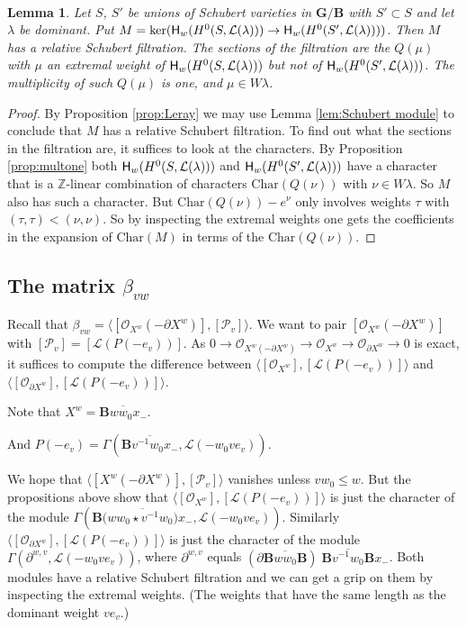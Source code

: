 \documentclass[sn-mathphys-num]{sn-jnl}%
\newcommand\tP{{\mathcal P}}
\newcommand{\Oo}{\mathcal O}
\newcommand{\Ll}{\mathcal L}
\newcommand{\Char}{{\mathrm{Char}}}
\newcommand{\sH}{{\sf H}}
\newcommand{\Z}{{\mathbb Z}}
\newcommand{\bg}{\mathbf G}
\newcommand{\fb}{\mathbf B}
\newcommand{\fX}{{ X}}
\newtheorem{lemma}[theorem]{Lemma}
\theoremstyle{definition}
\begin{document}
\

\begin{lemma}\label{lem:kerdecomp}
 Let $S$, $S'$ be  unions of Schubert varieties in $ \bg /{\fb}$ with $S'\subset S$  and let $\lambda$ be dominant.  
  Put $M=\ker({\sH}_w(H^0(S,\Ll(\lambda)))\to {\sH}_w(H^0(S',\Ll(\lambda))))$. Then $M$ has a relative Schubert filtration. The sections of the filtration are the $Q(\mu)$ with $\mu$ an extremal weight of 
${\sH}_w(H^0(S,\Ll(\lambda)))$ but not of ${\sH}_w(H^0(S',\Ll(\lambda)))$. The multiplicity of such $Q(\mu)$ is one, and $\mu\in W\lambda$.
\end{lemma}

\begin{proof}
By Proposition \ref{prop:Leray} we may use Lemma \ref{lem:Schubert module}
to conclude that $M$ has a relative Schubert filtration.
To find out what the sections in the filtration are, it suffices to look at the characters.
By Proposition \ref{prop:multone} both ${\sH}_w(H^0(S,\Ll(\lambda)))$ and ${\sH}_w(H^0(S',\Ll(\lambda)))$ have a character that is a $\Z$-linear combination of characters $\Char(Q(\nu))$ with $\nu\in W\lambda$.
So $M$ also has such a character. But $\Char(Q(\nu))-e^\nu$ only involves weights $\tau$ with $(\tau,\tau)<(\nu,\nu)$. So by inspecting the
extremal weights one gets the coefficients in the expansion of $\Char(M)$
in terms of the $\Char(Q(\nu))$.
\end{proof}

\subsection{The matrix $\beta_{vw}$}\label{subsec:beta}
Recall that $\beta_{vw}=\langle [\Oo_{\fX^w}(-\partial \fX^w)],[\tP_v] \rangle$.
We want to pair $[\Oo_{\fX^w}(-\partial \fX^w)]$
with $[\tP_v]=[\Ll(P(-e_v))]$. 
As $0\to\Oo_{\fX^w(-\partial \fX^w)}\to \Oo_{\fX^w}\to \Oo_{\partial \fX^w} \to0$
is exact, it suffices to compute the difference between $\langle [ \Oo_{\fX^w}],[\Ll(P(-e_v))]\rangle$ and $\langle [ \Oo_{\partial \fX^w}],[\Ll(P(-e_v))]\rangle$.


Note that $\fX^w=\overline{{\fb}ww_0x_-}$.

And $P(-e_v)=\Gamma(\overline{{\fb}v^{-1}w_0x_-},\Ll(-w_0ve_v))$.


We hope that $\langle[\fX^w(-\partial \fX^w)],[\tP_v]\rangle$ vanishes unless $vw_0\leq w$.
But the propositions above show that $\langle [ \Oo_{\fX^w}],[\Ll(P(-e_v))]\rangle$  is just the character of the module
$\Gamma(\overline{{\fb(}ww_0\star v^{-1}w_0)x_-},\Ll(-w_0ve_v))$.
Similarly $\langle [ \Oo_{\partial \fX^w}],[\Ll(P(-e_v))]\rangle$ is just the character of the module
$\Gamma(\partial^{w,v},\Ll(-w_0ve_v))$,
where $\partial^{w,v}$ equals 
$(\partial \overline{{\fb}ww_0{\fb}})\;\overline{{\fb}v^{-1}w_0{\fb}}x_-$. Both modules have a relative Schubert filtration and we can get a grip on them by inspecting the extremal weights. (The weights that have the same length as the dominant weight $ve_v$.)
\end{document}
